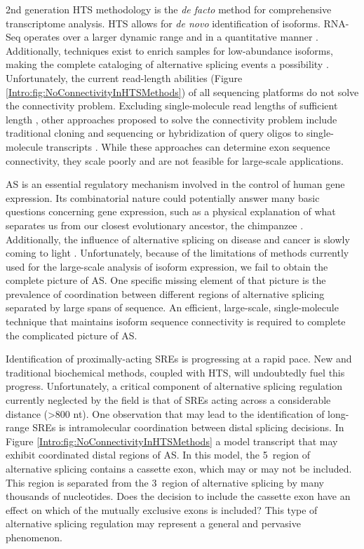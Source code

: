     2nd generation HTS methodology is the \textit{de facto} method for comprehensive transcriptome analysis. HTS allows for \textit{de novo} identification of isoforms. RNA-Seq operates over a larger dynamic range and in a quantitative manner \citep{Mortazavi2008}. Additionally, techniques exist to enrich samples for low-abundance isoforms, making the complete cataloging of alternative splicing events a possibility \citep{Djebali2008, Salehi-Ashtiani2008}. Unfortunately, the current read-length abilities (Figure \ref{Intro:fig:NoConnectivityInHTSMethods}) of all sequencing platforms do not solve the connectivity problem. Excluding single-molecule read lengths of sufficient length \citep{Shendure2004}, other approaches proposed to solve the connectivity problem include traditional cloning and sequencing or hybridization of query oligos to single-molecule transcripts \citep{Zhu2003, Calarco2007, Emerick2007}. While these approaches can determine exon sequence connectivity, they scale poorly and are not feasible for large-scale applications.

    AS is an essential regulatory mechanism involved in the control of human gene expression. Its combinatorial nature could potentially answer many basic questions concerning gene expression, such as a physical explanation of what separates us from our closest evolutionary ancestor, the chimpanzee \citep{Calarco2007a}. Additionally, the influence of alternative splicing on disease and cancer is slowly coming to light \citep{Tazi2009}. Unfortunately, because of the limitations of methods currently used for the large-scale analysis of isoform expression, we fail to obtain the complete picture of AS. One specific missing element of that picture is the prevalence of coordination between different regions of alternative splicing separated by large spans of sequence. An efficient, large-scale, single-molecule technique that maintains isoform sequence connectivity is required to complete the complicated picture of AS.

    Identification of proximally-acting SREs is progressing at a rapid pace. New and traditional biochemical methods, coupled with HTS, will undoubtedly fuel this progress. Unfortunately, a critical component of alternative splicing regulation currently neglected by the field is that of SREs acting across a considerable distance (>800 nt). One observation that may lead to the identification of long-range SREs is intramolecular coordination between distal splicing decisions. In Figure \ref{Intro:fig:NoConnectivityInHTSMethods} a model transcript that may exhibit coordinated distal regions of AS. In this model, the 5\textprime~region of alternative splicing contains a cassette exon, which may or may not be included. This region is separated from the 3\textprime~region of alternative splicing by many thousands of nucleotides. Does the decision to include the cassette exon have an effect on which of the mutually exclusive exons is included? This type of alternative splicing regulation may represent a general and pervasive phenomenon.


